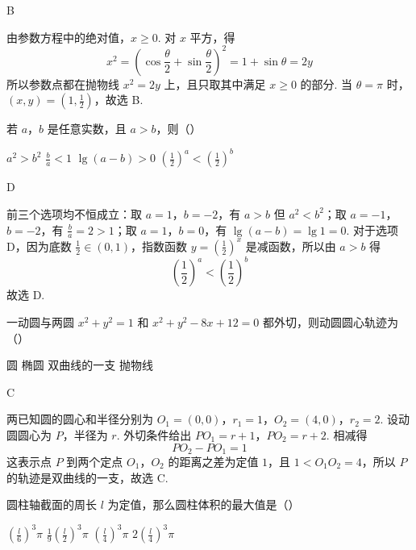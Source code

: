 \documentclass[UTF8,a4paper,oneside,11pt]{ctexbook}
\begin{document}
\begin{answer}
B
\end{answer}

\begin{solution}
由参数方程中的绝对值，\(x\geq0\). 对 \(x\) 平方，得
\[
x^2=\left(\cos\frac\theta2+\sin\frac\theta2\right)^2
=1+\sin\theta=2y
\]
所以参数点都在抛物线 \(x^2=2y\) 上，且只取其中满足 \(x\geq0\) 的部分. 当 \(\theta=\pi\) 时，\((x,y)=(1,\frac12)\)，故选 B.
\end{solution}

\begin{problem}
若 \(a\)，\(b\) 是任意实数，且 \(a>b\)，则（\quad）

\choices
    {\(a^2>b^2\)}
    {\(\frac{b}{a}<1\)}
    {\(\lg(a-b)>0\)}
    {\(\left(\frac{1}{2}\right)^a<\left(\frac{1}{2}\right)^b\)}
\end{problem}

\begin{answer}
D
\end{answer}

\begin{solution}
前三个选项均不恒成立：取 \(a=1\)，\(b=-2\)，有 \(a>b\) 但 \(a^2<b^2\)；取 \(a=-1\)，\(b=-2\)，有 \(\frac{b}{a}=2>1\)；取 \(a=1\)，\(b=0\)，有 \(\lg(a-b)=\lg1=0\). 对于选项 D，因为底数 \(\frac12\in(0,1)\)，指数函数 \(y=\left(\frac12\right)^x\) 是减函数，所以由 \(a>b\) 得
\[
\left(\frac12\right)^a<\left(\frac12\right)^b
\]
故选 D.
\end{solution}

\begin{problem}
一动圆与两圆 \(x^2+y^2=1\) 和 \(x^2+y^2-8x+12=0\) 都外切，则动圆圆心轨迹为（\quad）

\choices
    {圆}
    {椭圆}
    {双曲线的一支}
    {抛物线}
\end{problem}

\begin{answer}
C
\end{answer}

\begin{solution}
两已知圆的圆心和半径分别为
\(O_1=(0,0)\)，\(r_1=1\)，\(O_2=(4,0)\)，\(r_2=2\).
设动圆圆心为 \(P\)，半径为 \(r\). 外切条件给出
\(PO_1=r+1\)，\(PO_2=r+2\).
相减得
\[
PO_2-PO_1=1
\]
这表示点 \(P\) 到两个定点 \(O_1\)，\(O_2\) 的距离之差为定值 \(1\)，且 \(1<O_1O_2=4\)，所以 \(P\) 的轨迹是双曲线的一支，故选 C.
\end{solution}

\begin{problem}
圆柱轴截面的周长 \(l\) 为定值，那么圆柱体积的最大值是（\quad）

\choices
    {\(\left(\frac{l}{6}\right)^3\pi\)}
    {\(\frac{1}{9}\left(\frac{l}{2}\right)^3\pi\)}
    {\(\left(\frac{l}{4}\right)^3\pi\)}
    {\(2\left(\frac{l}{4}\right)^3\pi\)}
\end{problem}
\end{document}
